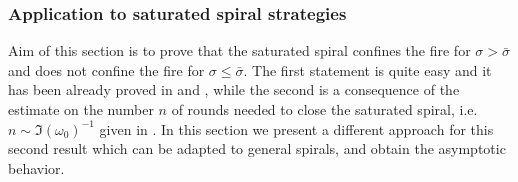 \documentclass[reqno]{amsart}
\theoremstyle{definition} \newtheorem{definition}{Definition}[section]
\theoremstyle{definition} \newtheorem{remark}[definition]{Remark}
\theoremstyle{plain} \newtheorem{lemma}[definition]{Lemma}
\theoremstyle{plain} \newtheorem{proposition}[definition]{Proposition}
\theoremstyle{plain} \newtheorem{theorem}[definition]{Theorem}
\theoremstyle{plain} \newtheorem{corollary}[definition]{Corollary}
\theoremstyle{definition} \newtheorem{example}[definition]{Example}
\theoremstyle{plain} \newtheorem{claim}[clai]{Claim}
\theoremstyle{definition} \newtheorem{assumption}[definition]{Assumption}
\theoremstyle{definition} \newtheorem{observation}[definition]{Observation}
\newcommand{\1}{\mathbbm 1}
\numberwithin{equation}{section} %
\theoremstyle{plain} \newtheorem*{theorem*}{Theorem}
\theoremstyle{plain} \newtheorem{mthm}[maintheorem]{Main Theorem}
\theoremstyle{plain} \newtheorem*{mthm*}{Main Theorem}
\theoremstyle{plain} \newtheorem*{conjecture*}{Conjecture}
\theoremstyle{plain} \newtheorem{conjecture}[definition]{Conjecture}
\theoremstyle{plain} \newtheorem*{problem*}{Problem}
\begin{document}


\subsubsection{Application to saturated spiral strategies}
\label{ss:subset:saturated}


Aim of this section is to prove that the saturated spiral confines the fire for $\sigma > \bar \sigma$ and does not confine the fire for $\sigma \leq \bar \sigma$. The first statement is quite easy and it has been already proved in \cite{Bressan_friends} and \cite[Theorem 1]{firefighter}, while the second is a consequence of the estimate on the number $n$ of rounds needed to close the saturated spiral, i.e. $n \sim \Im(\omega_0)^{-1}$ given in \cite[Theorem 4]{firefighter}. In this section we present a different approach for this second result which can be adapted to general spirals, and obtain the asymptotic behavior. %
\end{document}
